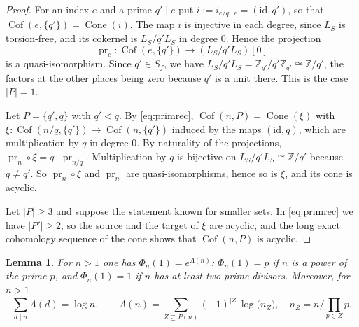 \documentclass[11pt]{amsart}
\newtheorem{lemma}[theorem]{Lemma}
\theoremstyle{definition}
\newcommand{\Z}{\mathbb Z}
\newcommand{\Prim}{\operatorname{Cof}}
\newcommand{\Cone}{\operatorname{Cone}}
\newcommand{\pr}{\operatorname{pr}}
\begin{document}
\begin{proof}
For an index $e$ and a prime $q'\mid e$ put $i:=i_{e/q',e}=(\mathrm{id},q')$,
so that $\Prim(e,\{q'\})=\Cone(i)$.  The map $i$ is injective in each degree,
since $L_S$ is torsion-free, and its cokernel is $L_S/q'L_S$ in degree $0$.
Hence the projection
\[
  \pr_e:\Prim(e,\{q'\})\longrightarrow (L_S/q'L_S)[0]
\]
is a quasi-isomorphism.  Since $q'\in S_f$, we have
$L_S/q'L_S=\Z_{q'}/q'\Z_{q'}\cong\Z/q'$, the factors at the other places being
zero because $q'$ is a unit there.  This is the case $|P|=1$.

Let $P=\{q',q\}$ with $q'<q$.  By \eqref{eq:primrec},
$\Prim(n,P)=\Cone(\xi)$ with
$\xi:\Prim(n/q,\{q'\})\to\Prim(n,\{q'\})$ induced by the maps
$(\mathrm{id},q)$, which are multiplication by $q$ in degree $0$.  By
naturality of the projections, $\pr_n\circ\xi=q\cdot\pr_{n/q}$.
Multiplication by $q$ is bijective on $L_S/q'L_S\cong\Z/q'$ because
$q\ne q'$.  So $\pr_n\circ\xi$ and $\pr_n$ are quasi-isomorphisms, hence so
is $\xi$, and its cone is acyclic.

Let $|P|\ge3$ and suppose the statement known for smaller sets.  In
\eqref{eq:primrec} we have $|P'|\ge2$, so the source and the target of
$\xi$ are acyclic, and the long exact cohomology sequence of the cone
shows that $\Prim(n,P)$ is acyclic.
\end{proof}

\begin{lemma}\label{lem:cyclotomicvalue}
For $n>1$ one has $\Phi_n(1)=e^{\Lambda(n)}$: $\Phi_n(1)=p$ if $n$ is a power
of the prime $p$, and $\Phi_n(1)=1$ if $n$ has at least two prime divisors.
Moreover, for $n>1$,
\begin{equation}\label{eq:mobiuslog}
  \sum_{d\mid n}\Lambda(d)=\log n,\qquad
  \Lambda(n)=\sum_{Z\subseteq P(n)}(-1)^{|Z|}\log\bigl(n_Z\bigr),
  \quad n_Z=n\big/\!\prod_{p\in Z}p .
\end{equation}
\end{lemma}
\end{document}
